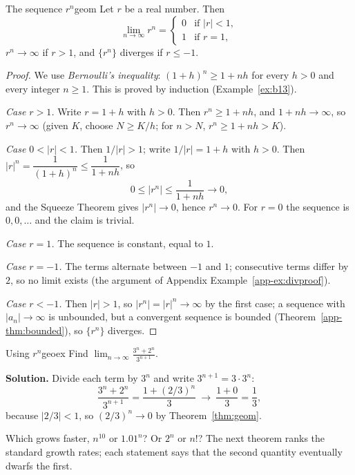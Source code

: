 \documentclass[11pt]{article}
\begin{document}
\begin{thm}{The sequence $r^n$}{geom}
Let $r$ be a real number. Then
\[
\lim_{n\to\infty}r^n=\begin{cases}0 & \text{if } |r|<1,\\ 1 & \text{if } r=1,\end{cases}
\]
$r^n\to\infty$ if $r>1$, and $\{r^n\}$ diverges if $r\le-1$.
\end{thm}
\begin{proof}
We use \emph{Bernoulli's inequality}: $(1+h)^n\ge1+nh$ for every $h>0$ and every integer $n\ge1$. This is proved by induction (Example~\ref{ex:b13}).

\emph{Case $r>1$.} Write $r=1+h$ with $h>0$. Then $r^n\ge1+nh$, and $1+nh\to\infty$, so $r^n\to\infty$ (given $K$, choose $N\ge K/h$; for $n>N$, $r^n\ge1+nh>K$).

\emph{Case $0<|r|<1$.} Then $1/|r|>1$; write $1/|r|=1+h$ with $h>0$. Then $|r|^n=\dfrac1{(1+h)^n}\le\dfrac1{1+nh}$, so
\[
0\le|r^n|\le\frac1{1+nh}\to0,
\]
and the Squeeze Theorem gives $|r^n|\to0$, hence $r^n\to0$. For $r=0$ the sequence is $0,0,\dots$ and the claim is trivial.

\emph{Case $r=1$.} The sequence is constant, equal to $1$.

\emph{Case $r=-1$.} The terms alternate between $-1$ and $1$; consecutive terms differ by $2$, so no limit exists (the argument of Appendix Example~\ref{app-ex:divproof}).

\emph{Case $r<-1$.} Then $|r|>1$, so $|r^n|=|r|^n\to\infty$ by the first case; a sequence with $|a_n|\to\infty$ is unbounded, but a convergent sequence is bounded (Theorem~\ref{app-thm:bounded}), so $\{r^n\}$ diverges.
\end{proof}

\begin{exmp}{Using $r^n$}{geoex}
Find $\displaystyle\lim_{n\to\infty}\frac{3^n+2^n}{3^{n+1}}$.

\textbf{Solution.} Divide each term by $3^n$ and write $3^{n+1}=3\cdot3^n$:
\[
\frac{3^n+2^n}{3^{n+1}}=\frac{1+(2/3)^n}{3}\ \longrightarrow\ \frac{1+0}{3}=\frac13,
\]
because $|2/3|<1$, so $(2/3)^n\to0$ by Theorem~\ref{thm:geom}.
\end{exmp}

Which grows faster, $n^{10}$ or $1.01^n$? Or $2^n$ or $n!$? The next theorem ranks the standard growth rates; each statement says that the second quantity eventually dwarfs the first.
\end{document}
